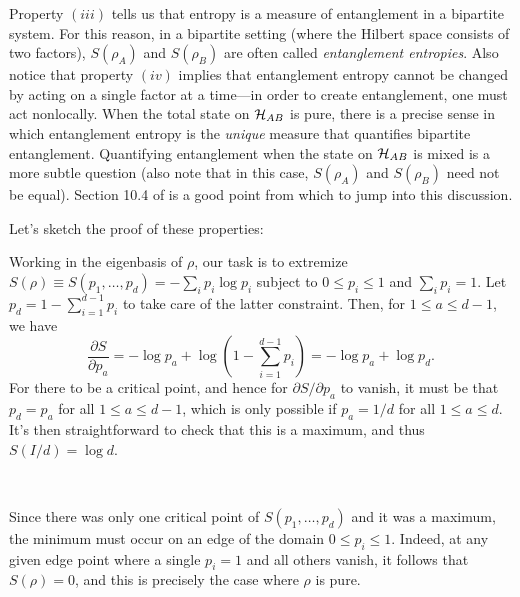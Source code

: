 \documentclass[a4paper,11pt]{article}
\newcommand{\Hil}{{\cal H}}
\begin{document}
Property $(iii)$ tells us that entropy is a measure of entanglement in a bipartite system.
For this reason, in a bipartite setting (where the Hilbert space consists of two factors), $S(\rho_A)$ and $S(\rho_B)$ are often called \emph{entanglement entropies}.
Also notice that property $(iv)$ implies that entanglement entropy cannot be changed by acting on a single factor at a time---in order to create entanglement, one must act nonlocally.
When the total state on $\Hil_{AB}$ is pure, there is a precise sense in which entanglement entropy is the \emph{unique} measure that quantifies bipartite entanglement.
Quantifying entanglement when the state on $\Hil_{AB}$ is mixed is a more subtle question (also note that in this case, $S(\rho_A)$ and $S(\rho_B)$ need not be equal).
Section 10.4 of \cite{Preskill:2016htv} is a good point from which to jump into this discussion.

Let's sketch the proof of these properties:\medskip

 Working in the eigenbasis of $\rho$, our task is to extremize $S(\rho) \equiv S(p_1, \dots, p_d) = - \sum_i p_i \log p_i$ subject to $0 \leq p_i \leq 1$ and $\sum_i p_i = 1$.
Let $p_d = 1- \sum_{i=1}^{d-1} p_i$ to take care of the latter constraint.
Then, for $1 \leq a \leq d-1$, we have
\begin{equation}
\frac{\partial S}{\partial p_a} = - \log p_a + \log\left(1 - \sum_{i=1}^{d-1} p_i \right) = - \log p_a + \log p_d .
\end{equation}
For there to be a critical point, and hence for $\partial S/\partial p_a$ to vanish, it must be that $p_d = p_a$ for all $1 \leq a \leq d-1$, which is only possible if $p_a = 1/d$ for all $1 \leq a \leq d$.
It's then straightforward to check that this is a maximum, and thus $S(I/d) = \log d$.

~

 Since there was only one critical point of $S(p_1, \dots, p_d)$ and it was a maximum, the minimum must occur on an edge of the domain $0 \leq p_i \leq 1$.
Indeed, at any given edge point where a single $p_i = 1$ and all others vanish, it follows that $S(\rho) = 0$, and this is precisely the case where $\rho$ is pure.

~
\end{document}
